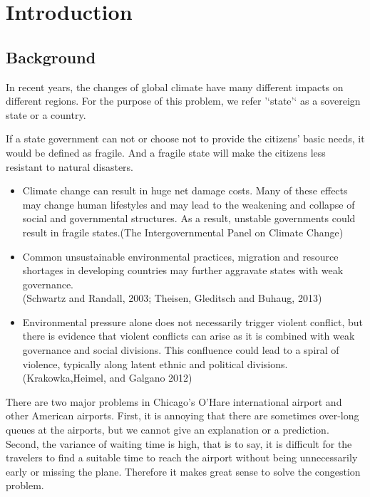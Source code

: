 \documentclass{mcmthesis}
\begin{document}
\maketitle

\newpage
\tableofcontents
\newpage

\section{Introduction}%
\subsection{Background}
\par In recent years, the changes of global climate have many different impacts on different regions. For the purpose of this problem, we refer '`state'` as a sovereign state or a country.
\par If a state government can not or choose not to provide the citizens' basic needs, it would be defined as fragile. And a fragile state will make the citizens less resistant to natural disasters.
\begin{itemize}
\item	Climate change can result in huge net damage costs. Many of these effects may change human lifestyles and may lead to the weakening and collapse of social and governmental structures. As a result, unstable governments could result in fragile states.(The Intergovernmental Panel on Climate Change)
\item	Common unsustainable environmental practices, migration and resource shortages in developing countries may further aggravate states with weak governance.\\(Schwartz and Randall, 2003; Theisen, Gleditsch and Buhaug, 2013)
\item 	Environmental pressure alone does not necessarily trigger violent conflict, but there is evidence that violent conflicts can arise as it is combined with weak governance and social divisions. This confluence could lead to a spiral of violence, typically along latent ethnic and political divisions.(Krakowka,Heimel, and Galgano 2012)
\end{itemize}
\par There are two major problems in Chicago's O'Hare international airport and other
American airports. First, it is annoying that there are sometimes over-long queues at
the airports, but we cannot give an explanation or a prediction. Second, the variance of
waiting time is high, that is to say, it is difficult for the travelers to find a suitable time
to reach the airport without being unnecessarily early or missing the plane. Therefore it
makes great sense to solve the congestion problem.
\end{document}
